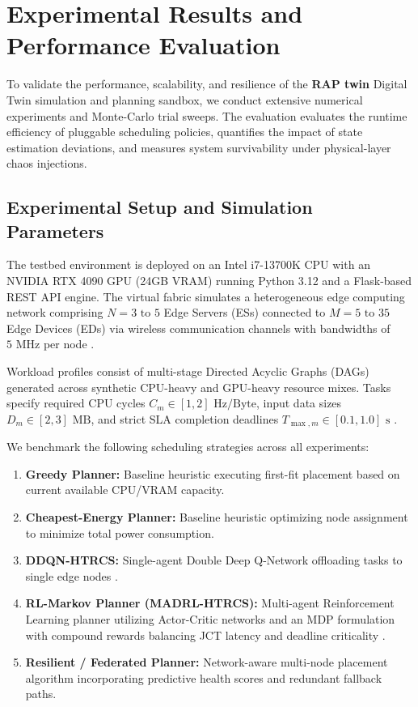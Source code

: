 \documentclass[twoside,twocolumn,10pt]{article}
\begin{document}
\section{Experimental Results and Performance Evaluation}

To validate the performance, scalability, and resilience of the \textbf{RAP twin} Digital Twin simulation and planning sandbox, we conduct extensive numerical experiments and Monte-Carlo trial sweeps. The evaluation evaluates the runtime efficiency of pluggable scheduling policies, quantifies the impact of state estimation deviations, and measures system survivability under physical-layer chaos injections.

\subsection{Experimental Setup and Simulation Parameters}
The testbed environment is deployed on an Intel i7-13700K CPU with an NVIDIA RTX 4090 GPU (24GB VRAM) running Python 3.12 and a Flask-based REST API engine. The virtual fabric simulates a heterogeneous edge computing network comprising $N = 3 \text{ to } 5$ Edge Servers (ESs) connected to $M = 5 \text{ to } 35$ Edge Devices (EDs) via wireless communication channels with bandwidths of $5\text{ MHz}$ per node \cite{dai2024, tran2025}.

Workload profiles consist of multi-stage Directed Acyclic Graphs (DAGs) generated across synthetic CPU-heavy and GPU-heavy resource mixes. Tasks specify required CPU cycles $C_m \in [1, 2]\text{ Hz/Byte}$, input data sizes $D_m \in [2, 3]\text{ MB}$, and strict SLA completion deadlines $T_{\max,m} \in [0.1, 1.0]\text{ s}$ \cite{tran2025, dai2024}.

We benchmark the following scheduling strategies across all experiments:
\begin{enumerate}
    \item \textbf{Greedy Planner:} Baseline heuristic executing first-fit placement based on current available CPU/VRAM capacity.
    \item \textbf{Cheapest-Energy Planner:} Baseline heuristic optimizing node assignment to minimize total power consumption.
    \item \textbf{DDQN-HTRCS:} Single-agent Double Deep Q-Network offloading tasks to single edge nodes \cite{xu2023}.
    \item \textbf{RL-Markov Planner (MADRL-HTRCS):} Multi-agent Reinforcement Learning planner utilizing Actor-Critic networks and an MDP formulation with compound rewards balancing JCT latency and deadline criticality \cite{xu2023, sai2024}.
    \item \textbf{Resilient / Federated Planner:} Network-aware multi-node placement algorithm incorporating predictive health scores and redundant fallback paths.
\end{enumerate}
\end{document}
